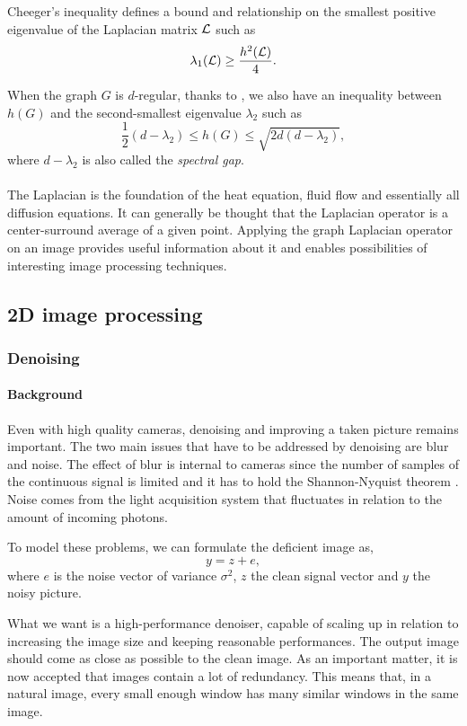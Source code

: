 Cheeger's inequality defines a bound and relationship on the smallest positive eigenvalue of the Laplacian matrix \(\operatorname{\mathcal{L}} \) such as
\[\lambda_1(\operatorname{\mathcal{L}}) \ge \frac{h^2(\operatorname{\mathcal{L}})}{4}.\]

When the graph \(G\) is \(d\)-regular, thanks to \cite{cvetkovic_spectra_1980}, we also have an inequality between \(h(G)\) and the second-smallest eigenvalue \(\lambda_2\) such as
\[\frac{1}{2}(d-\lambda_2) \le h(G) \le \sqrt{2d(d-\lambda_2)},\]
where \(d - \lambda_2\) is also called the \textit{spectral gap}.

\paragraph{}
The Laplacian is the foundation of the heat equation, fluid flow and essentially all diffusion equations.
It can generally be thought that the Laplacian operator is a center-surround average \cite{siam_slides_2016} of a given point.
Applying the graph Laplacian operator on an image provides useful information about it and enables possibilities of interesting image processing techniques.

\subsection{2D image processing}

\subsubsection{Denoising}

\paragraph{Background}
Even with high quality cameras, denoising and improving a taken picture remains important.
The two main issues that have to be addressed by denoising are blur and noise.
The effect of blur is internal to cameras since the number of samples of the continuous signal is limited and it has to hold the Shannon-Nyquist theorem \cite{buades_review_2005}.
Noise comes from the light acquisition system that fluctuates in relation to the amount of incoming photons.

To model these problems, we can formulate the deficient image as,
\[y = z + e,\]
where \(e\) is the noise vector of variance \(\sigma^2\), \(z\) the clean signal vector and \(y\) the noisy picture.

What we want is a high-performance denoiser, capable of scaling up in relation to increasing the image size and keeping reasonable performances.
The output image should come as close as possible to the clean image.
As an important matter, it is now accepted that images contain a lot of redundancy.
This means that, in a natural image, every small enough window has many similar windows in the same image.

